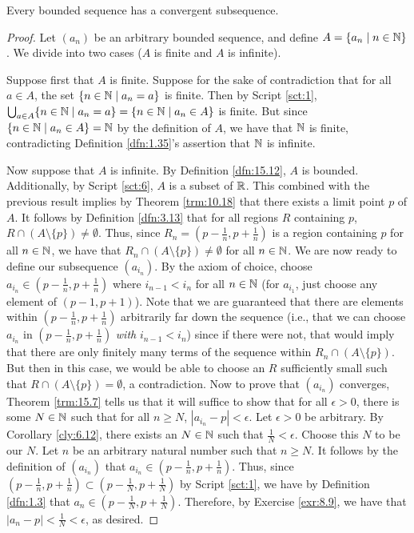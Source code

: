 \documentclass[../main.tex]{subfiles}
\begin{document}
\begin{theorem}\label{trm:15.18}
    Every bounded sequence has a convergent subsequence.
    \begin{proof}
        Let $(a_n)$ be an arbitrary bounded sequence, and define $A=\{a_n\mid n\in\mathbb{N}\}$. We divide into two cases ($A$ is finite and $A$ is infinite).\par
        Suppose first that $A$ is finite. Suppose for the sake of contradiction that for all $a\in A$, the set $\{n\in\mathbb{N}\mid a_n=a\}$ is finite. Then by Script \ref{sct:1}, $\bigcup_{a\in A}\{n\in\mathbb{N}\mid a_n=a\}=\{n\in\mathbb{N}\mid a_n\in A\}$ is finite. But since $\{n\in\mathbb{N}\mid a_n\in A\}=\mathbb{N}$ by the definition of $A$, we have that $\mathbb{N}$ is finite, contradicting Definition \ref{dfn:1.35}'s assertion that $\mathbb{N}$ is infinite.\par
        Now suppose that $A$ is infinite. By Definition \ref{dfn:15.12}, $A$ is bounded. Additionally, by Script \ref{sct:6}, $A$ is a subset of $\mathbb{R}$. This combined with the previous result implies by Theorem \ref{trm:10.18} that there exists a limit point $p$ of $A$. It follows by Definition \ref{dfn:3.13} that for all regions $R$ containing $p$, $R\cap(A\setminus\{p\})\neq\emptyset$. Thus, since $R_n=(p-\frac{1}{n},p+\frac{1}{n})$ is a region containing $p$ for all $n\in\mathbb{N}$, we have that $R_n\cap(A\setminus\{p\})\neq\emptyset$ for all $n\in\mathbb{N}$. We are now ready to define our subsequence $(a_{i_n})$. By the axiom of choice, choose $a_{i_n}\in(p-\frac{1}{n},p+\frac{1}{n})$ where $i_{n-1}<i_n$ for all $n\in\mathbb{N}$ (for $a_{i_1}$, just choose any element of $(p-1,p+1)$). Note that we are guaranteed that there are elements within $(p-\frac{1}{n},p+\frac{1}{n})$ arbitrarily far down the sequence (i.e., that we can choose $a_{i_n}$ in $(p-\frac{1}{n},p+\frac{1}{n})$ \emph{with} $i_{n-1}<i_n$) since if there were not, that would imply that there are only finitely many terms of the sequence within $R_n\cap(A\setminus\{p\})$. But then in this case, we would be able to choose an $R$ sufficiently small such that $R\cap(A\setminus\{p\})=\emptyset$, a contradiction. Now to prove that $(a_{i_n})$ converges, Theorem \ref{trm:15.7} tells us that it will suffice to show that for all $\epsilon>0$, there is some $N\in\mathbb{N}$ such that for all $n\geq N$, $|a_{i_n}-p|<\epsilon$. Let $\epsilon>0$ be arbitrary. By Corollary \ref{cly:6.12}, there exists an $N\in\mathbb{N}$ such that $\frac{1}{N}<\epsilon$. Choose this $N$ to be our $N$. Let $n$ be an arbitrary natural number such that $n\geq N$. It follows by the definition of $(a_{i_n})$ that $a_{i_n}\in(p-\frac{1}{n},p+\frac{1}{n})$. Thus, since $(p-\frac{1}{n},p+\frac{1}{n})\subset(p-\frac{1}{N},p+\frac{1}{N})$ by Script \ref{sct:1}, we have by Definition \ref{dfn:1.3} that $a_n\in(p-\frac{1}{N},p+\frac{1}{N})$. Therefore, by Exercise \ref{exr:8.9}, we have that $|a_n-p|<\frac{1}{N}<\epsilon$, as desired.
    \end{proof}
\end{theorem}
\end{document}
